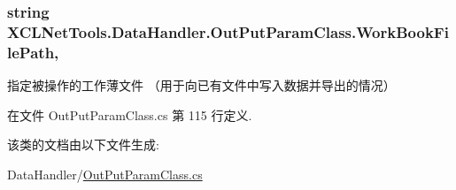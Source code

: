 \hypertarget{class_x_c_l_net_tools_1_1_data_handler_1_1_out_put_param_class_ac24509285a5c4a9bec38099e2070aeba}{
\subsubsection[{Work\-Book\-File\-Path}]{\setlength{\rightskip}{0pt plus 5cm}string X\-C\-L\-Net\-Tools.\-Data\-Handler.\-Out\-Put\-Param\-Class.\-Work\-Book\-File\-Path\hspace{0.3cm}{\ttfamily [get]}, {\ttfamily [set]}}}\label{class_x_c_l_net_tools_1_1_data_handler_1_1_out_put_param_class_ac24509285a5c4a9bec38099e2070aeba}


指定被操作的工作薄文件 （用于向已有文件中写入数据并导出的情况） 



在文件 Out\-Put\-Param\-Class.\-cs 第 115 行定义.



该类的文档由以下文件生成\-:\begin{DoxyCompactItemize}
\item 
Data\-Handler/\hyperlink{_out_put_param_class_8cs}{Out\-Put\-Param\-Class.\-cs}\end{DoxyCompactItemize}
